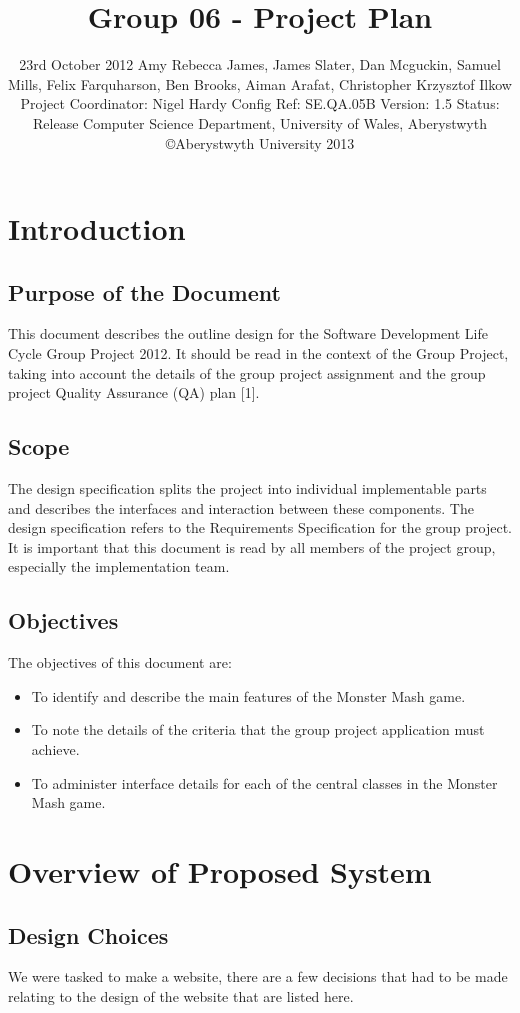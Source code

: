 \documentclass[titlepage]{article}
\title{Group 06 - Project Plan}
\date{23rd October 2012 \linebreak Amy Rebecca James, James Slater, Dan Mcguckin, Samuel Mills, Felix Farquharson, \linebreak Ben Brooks, Aiman Arafat, Christopher Krzysztof Ilkow \linebreak Project Coordinator: Nigel Hardy \linebreak Config Ref: SE.QA.05B \linebreak Version: 1.5 \linebreak Status: Release \linebreak Computer Science Department, University of Wales, Aberystwyth \linebreak \copyright Aberystwyth University 2013}
\begin{document}
\maketitle
\tableofcontents
\newpage
\section{Introduction}
\subsection{Purpose of the Document}
This document describes the outline design for the Software Development Life Cycle Group Project 2012. It should be read in the context of the Group Project, taking into account the details of the group project assignment and the group project Quality Assurance (QA) plan [1].
\subsection{Scope}
The design specification splits the project into individual implementable parts and describes the interfaces and interaction between these components. The design specification refers to the Requirements Specification for the group project. It is important that this document is read by all members of the project group, especially the implementation team.
\subsection{Objectives}
The objectives of this document are:
\begin{itemize}
\item{To identify and describe the main features of the Monster Mash game.}
\item{To note the details of the criteria that the group project application must achieve.}
\item{ To administer interface details for each of the central classes in the Monster
Mash game.}
\end{itemize}
\newpage
\section{Overview of Proposed System}
\subsection{Design Choices}
We were tasked to make a website, there are a few decisions that had to be made relating to the design of the website that are listed here.
\end{document}
